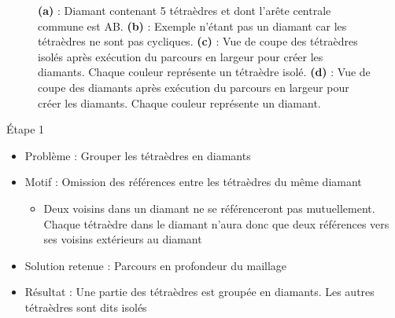\documentclass[9pt]{beamer}
\begin{document}
\begin{frame}
\begin{figure}[H]
\begin{subfigure}{.24\textwidth}
  \caption{}
\end{subfigure}
\caption{\textbf{(a)} : Diamant contenant 5 tétraèdres et dont l'arête centrale commune est AB. \textbf{(b)} : Exemple n'étant pas un diamant car les tétraèdres ne sont pas cycliques. \textbf{(c)} : Vue de coupe des tétraèdres isolés après exécution du parcours en largeur pour créer les diamants. Chaque couleur représente un tétraèdre isolé. \textbf{(d)} : Vue de coupe des diamants après exécution du parcours en largeur pour créer les diamants. Chaque couleur représente un diamant.}
\end{figure}
\begin{block}{\'{E}tape 1}
\begin{itemize}
\item Problème : Grouper les tétraèdres en diamants
\item Motif : Omission des références entre les tétraèdres du même diamant
\begin{itemize}
\item Deux voisins dans un diamant ne se référenceront pas mutuellement. Chaque tétraèdre dans le diamant n'aura donc que deux références vers ses voisins extérieurs au diamant
\end{itemize}
\item Solution retenue : Parcours en profondeur du maillage
\item Résultat : Une partie des tétraèdres est groupée en diamants. Les autres tétraèdres sont dits isolés
\end{itemize}
\end{block}
\end{frame}
\end{document}
